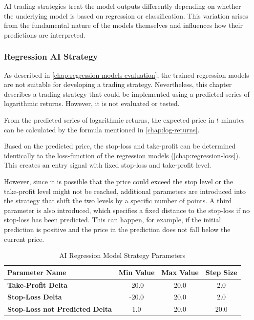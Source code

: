 AI trading strategies treat the model outputs differently depending on whether the underlying model is based on regression or classification.
This variation arises from the fundamental nature of the models themselves and influences how their predictions are interpreted.

\subsubsection{Regression AI Strategy}
\label{chap:regression-ai-stategy}

As described in \autoref{chap:regression-models-evaluation}, the trained regression models are not suitable for developing a trading strategy.
Nevertheless, this chapter describes a trading strategy that could be implemented using a predicted series of logarithmic returns.
However, it is not evaluated or tested.

From the predicted series of logarithmic returns, the expected price in $t$ minutes can be calculated by the formula mentioned in \autoref{chap:log-returns}.

Based on the predicted price, the stop-loss and take-profit can be determined identically to the loss-function of the regression models (\autoref{chap:regression-loss}).
This creates an entry signal with fixed stop-loss and take-profit level.

However, since it is possible that the price could exceed the stop level or the take-profit level might not be reached, additional parameters are introduced into the strategy that shift the two levels by a specific number of points.
A third parameter is also introduced, which specifies a fixed distance to the stop-loss if no stop-loss has been predicted.
This can happen, for example, if the initial prediction is positive and the price in the prediction does not fall below the current price.

\begin{table}[H]
    \centering
    \begin{tabular}{L{4cm}ccc}
        \toprule
        \textbf{Parameter Name} & Min Value & Max Value & Step Size
        \\
        \midrule
        \textbf{Take-Profit Delta}             & -20.0 & 20.0 & 2.0  \\
        \textbf{Stop-Loss Delta}               & -20.0 & 20.0 & 2.0  \\
        \textbf{Stop-Loss not Predicted Delta} & 1.0   & 20.0 & 20.0 \\
        \bottomrule
    \end{tabular}
    \caption{AI Regression Model Strategy Parameters}
    \label{tbl:regression-strategy-parameters}
\end{table}

